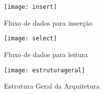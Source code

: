\begin{figure}[!h]
\caption{\label{fig:insert} Fluxo de dados para inserção}
\begin{center}
\texttt{[image: insert]}
\end{center}
\end{figure}

\begin{figure}[!h]
\caption{\label{fig:select} Fluxo de dados para leitura}
\begin{center}
\texttt{[image: select]}
\end{center}
\end{figure}

\begin{figure}[!h]
\caption{\label{fig:estruturageral} Estrutura Geral da Arquitetura}
\begin{center}
\texttt{[image: estruturageral]}
\end{center}
\end{figure}
